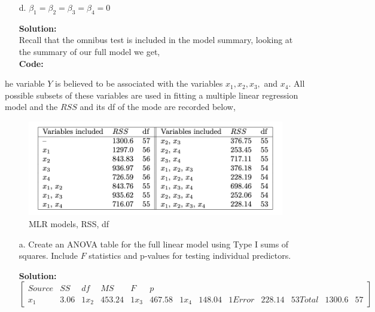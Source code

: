 \documentclass[12pt]{article}
\makeatletter
\theoremstyle{homework}
\newenvironment{exercise}[1]
{\def\@currentlabel{#1}\exercisecore}
{\endexercisecore}
\newcommand{\localhead}[1]{\par\smallskip\noindent\textbf{#1}\nobreak\\}%
\newcommand\solution{\localhead{Solution:}}
\makeatother
\begin{document}
\begin{exercise}{2}
\begin{enumerate}
   \item[d.] $\beta_1 = \beta_2 = \beta_3 = \beta_4 = 0$\\
   \solution Recall that the omnibus test is included in the model summary, looking at the 
   summary of our full model we get,   \\
   \textbf{Code:}
   \begin{center}
   
   \end{center} 
   \newpage
  \end{enumerate}  
\end{exercise}



\begin{exercise} The variable $Y$ is believed to be associated with the variables $x_1, x_2, x_3,$ and $x_4$.
  All possible subsets of these variables are used in fitting a multiple linear regression model and the $RSS$ 
  and its df of the mode are recorded below, 
    \begin{figure}[H]
    \begin{center}
    \caption{MLR models, RSS, df}
    \includegraphics[width = \textwidth]{p1.png}
    \end{center}
    \end{figure}
  \begin{enumerate}
    \item[a.] Create an ANOVA table for the full linear model using Type I sums of squares. Include $F$ statistics 
    and p-values for testing individual predictors. \\

    \solution
    \begin{equation*}
      \begin{bmatrix}
        Source & SS & df & MS & F & p\\
        x_1 & 3.06 & 1
        x_2 & 453.24 & 1
        x_3 & 467.58 & 1
        x_4 & 148.04 & 1
        Error & 228.14 & 53
        Total & 1300.6 & 57

      \end{bmatrix}
    \end{equation*}
  \end{enumerate}


  
\end{exercise}
\end{document}
